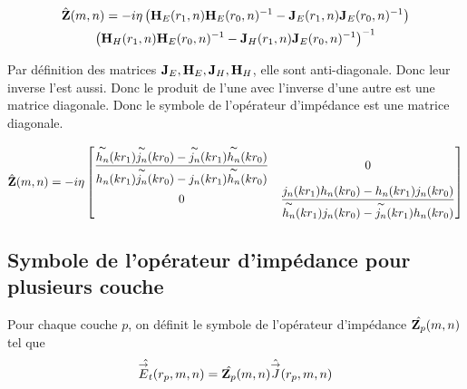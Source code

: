         \begin{multline}
            \hat{\mZ}(m,n) = -i\eta
            \left(
                \mH_{E}(r_1,n)
                \mH_{E}(r_0,n)^{-1}
                -
                \mJ_{E}(r_1,n)
                \mJ_{E}(r_0,n)^{-1}
            \right)
            \\
            \left(
                \mH_{H}(r_1,n)
                \mH_{E}(r_0,n)^{-1}
                -
                \mJ_{H}(r_1,n)
                \mJ_{E}(r_0,n)^{-1}
            \right)^{-1}
        \end{multline}

        Par définition des matrices \(\mJ_E,\mH_E,\mJ_H,\mH_H\), elle sont anti-diagonale. Donc leur inverse l'est aussi. Donc le produit de l'une avec l'inverse d'une autre est une matrice diagonale. Donc le symbole de l'opérateur d'impédance est une matrice diagonale.

        \begin{equation}
            \hat{\mZ}(m,n) = -i\eta
            \begin{bmatrix}
                \frac
                {\tilde{h_n}(kr_1)\tilde{j_n}(kr_0)-\tilde{j_n}(kr_1)\tilde{h_n}(kr_0)}
                {{h_n}(kr_1)\tilde{j_n}(kr_0)-{j_n}(kr_1)\tilde{h_n}(kr_0)} & 0
                \\
                0 & \frac
                {{j_n}(kr_1){h_n}(kr_0)-{h_n}(kr_1){j_n}(kr_0)}
                {\tilde{h_n}(kr_1){j_n}(kr_0)-\tilde{j_n}(kr_1){h_n}(kr_0)}
            \end{bmatrix}
        \end{equation}

    \subsection{Symbole de l'opérateur d'impédance pour plusieurs couche}

        \begin{figure}[!hbt]
          \centering
          \begin{tikzpicture}
            
          \end{tikzpicture}
        \end{figure}


        \begin{defn}
          Pour chaque couche \(p\), on définit le symbole de l'opérateur d'impédance \(\hat{\mZ_p}(m,n)\) tel que 
          \[
              \hat{\vE_t}(r_p,m,n) = \hat{\mZ_p}(m,n)\hat{\vJ}(r_p,m,n)
          \]
        \end{defn}

